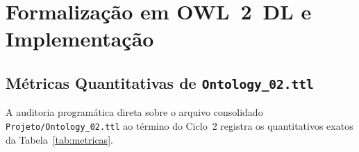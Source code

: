 \documentclass[11pt,a4paper]{article}
\begin{document}
\section{Formalização em OWL~2~DL e Implementação}\label{sec:form}

\subsection{Métricas Quantitativas de \texttt{Ontology\_02.ttl}}

A auditoria programática direta sobre o arquivo consolidado \texttt{Projeto/Ontology\_02.ttl} ao término do Ciclo~2 registra os quantitativos exatos da Tabela~\ref{tab:metricas}.
\end{document}
